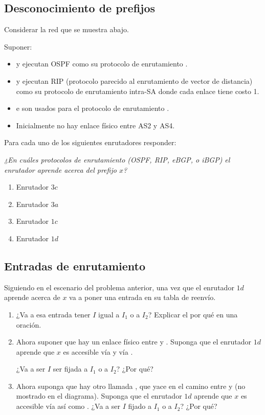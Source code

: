 \documentclass[12pt]{report}
\begin{document}
\begin{exer}
\subsection{Desconocimiento de prefijos \sthree}

Considerar la red que se muestra abajo. 

Suponer:
\begin{itemize}
\item {} y  ejecutan OSPF como su protocolo de enrutamiento .
\item {} y  ejecutan RIP (protocolo parecido al enrutamiento de vector de distancia) como su protocolo de enrutamiento intra-SA donde cada enlace tiene costo 1.
\item {} e  son usados para el protocolo de enrutamiento .
\item Inicialmente no hay enlace físico entre AS2 y AS4.
\end{itemize}


Para cada uno de los siguientes enrutadores responder: 

\emph{¿En cuáles protocolos de enrutamiento (OSPF, RIP, eBGP, o iBGP) el enrutador aprende acerca del prefijo $x$?}
 
\begin{enumerate}
\item Enrutador $3c$
\item Enrutador $3a$
\item Enrutador $1c$
\item Enrutador $1d$
\end{enumerate}
\end{exer}

\begin{exer}
\subsection{Entradas de enrutamiento \sthree}

Siguiendo en el escenario del problema anterior, una vez que el enrutador $1d$ aprende acerca de $x$ va a poner una entrada  en su tabla de reenvío. 

\begin{enumerate}
\item ¿Va a esa entrada tener $I$ igual a $I_1$ o a $I_2$? Explicar el por qué en una oración.
\item Ahora suponer que hay un enlace físico entre  y . Suponga que el enrutador $1d$ aprende que $x$ es accesible vía  y vía .

¿Va a ser $I$ ser fijada a $I_1$ o a $I_2$? ¿Por qué?
\item Ahora suponga que hay otro  llamada , que yace en el camino entre  y 
(no mostrado en el diagrama). Suponga que el enrutador $1d$ aprende que $x$ es accesible vía
 así como . ¿Va a ser $I$ fijado a $I_1$ o a $I_2$? ¿Por qué?
\end{enumerate}
\end{exer}
\end{document}
